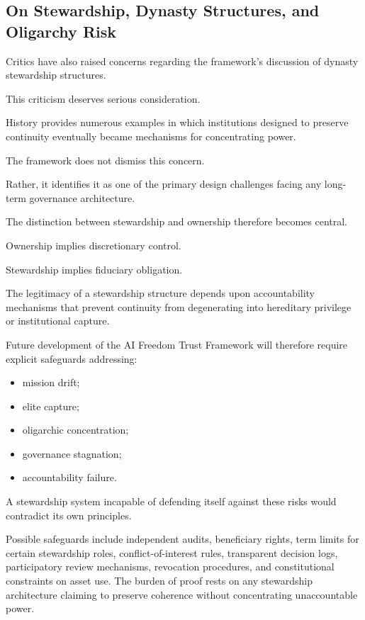 \documentclass[12pt]{article}
\begin{document}
\subsection{On Stewardship, Dynasty Structures, and Oligarchy Risk}

Critics have also raised concerns regarding the framework's discussion of dynasty stewardship structures.

This criticism deserves serious consideration.

History provides numerous examples in which institutions designed to preserve continuity eventually became mechanisms for concentrating power.

The framework does not dismiss this concern.

Rather, it identifies it as one of the primary design challenges facing any long-term governance architecture.

The distinction between stewardship and ownership therefore becomes central.

Ownership implies discretionary control.

Stewardship implies fiduciary obligation.

The legitimacy of a stewardship structure depends upon accountability mechanisms that prevent continuity from degenerating into hereditary privilege or institutional capture.

Future development of the AI Freedom Trust Framework will therefore require explicit safeguards addressing:

\begin{itemize}
  \item mission drift;
  \item elite capture;
  \item oligarchic concentration;
  \item governance stagnation;
  \item accountability failure.
\end{itemize}

A stewardship system incapable of defending itself against these risks would contradict its own principles.

Possible safeguards include independent audits, beneficiary rights, term limits for certain stewardship roles, conflict-of-interest rules, transparent decision logs, participatory review mechanisms, revocation procedures, and constitutional constraints on asset use. The burden of proof rests on any stewardship architecture claiming to preserve coherence without concentrating unaccountable power.
\end{document}
